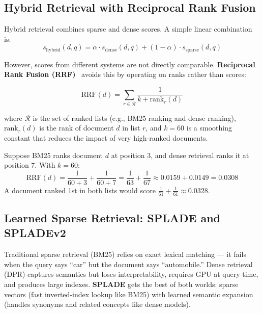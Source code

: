 \subsection{Hybrid Retrieval with Reciprocal Rank Fusion}
\label{hybrid-retrieval-with-reciprocal-rank-fusion}

Hybrid retrieval combines sparse and dense scores. A simple linear combination is: 
\begin{equation}
  s_{\text{hybrid}}(d, q) = \alpha \cdot s_{\text{dense}}(d, q) + (1-\alpha) \cdot s_{\text{sparse}}(d, q)
\end{equation}

However, scores from different systems are not directly comparable. \textbf{Reciprocal Rank Fusion (RRF)}~\cite{cormack2009reciprocal} avoids this by operating on ranks rather than scores:

\begin{equation}
  \text{RRF}(d) = \sum_{r \in \mathcal{R}} \frac{1}{k + \text{rank}_r(d)}
\label{eq:rrf}
\end{equation}

where $\mathcal{R}$ is the set of ranked lists (e.g., BM25 ranking and dense ranking), $\text{rank}_r(d)$ is the rank of document $d$ in list $r$, and $k = 60$ is a smoothing constant that reduces the impact of very high-ranked documents.

\begin{examplebox}
Suppose BM25 ranks document $d$ at position 3, and dense retrieval ranks it at position 7. With $k = 60$: 
\[
\text{RRF}(d) = \frac{1}{60 + 3} + \frac{1}{60 + 7} = \frac{1}{63} + \frac{1}{67} \approx 0.0159 + 0.0149 = 0.0308
\]
 A document ranked 1st in both lists would score $\frac{1}{61} + \frac{1}{61} \approx 0.0328$.
\end{examplebox}

\subsection{Learned Sparse Retrieval: SPLADE and SPLADEv2}
\label{learned-sparse-retrieval-splade-and-spladev2}

\begin{intuitionbox}
Traditional sparse retrieval (BM25) relies on exact lexical matching --- it fails when the query says ``car'' but the document says ``automobile.'' Dense retrieval (DPR) captures semantics but loses interpretability, requires GPU at query time, and produces large indexes. \textbf{SPLADE} gets the best of both worlds: sparse vectors (fast inverted-index lookup like BM25) with learned semantic expansion (handles synonyms and related concepts like dense models).
\end{intuitionbox}

